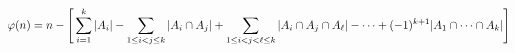 \documentclass[preview]{standalone}
\begin{document}
\begin{align*}
\special{dvisvgm:raw <g id='unique000'>}\varphi(n) = n - \Bigg[\sum_{i=1}^{k} |A_i| - \sum_{1 \le i < j \le k} |A_i \cap A_j| + \sum_{1 \le i < j < \ell \le k} |A_i \cap A_j \cap A_\ell| - \cdots + (-1)^{k+1} |A_1 \cap \cdots \cap A_k|\Bigg]\special{dvisvgm:raw </g>}
\end{align*}
\end{document}
